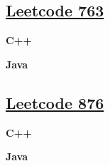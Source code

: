 \subsection{\href{https://leetcode-cn.com/}{Leetcode 763}}\label{app:codelist:leetcode:763}

\textbf{C++}\par


\textbf{Java}\par



\subsection{\href{https://leetcode-cn.com/}{Leetcode 876}}\label{app:codelist:leetcode:876}

\textbf{C++}\par


\textbf{Java}\par



